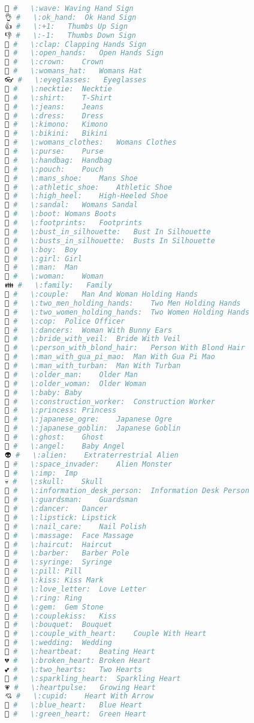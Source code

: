 \begin{lstlisting}[language=Julia, style=julia]
👋 #   \:wave: Waving Hand Sign
👌 #   \:ok_hand:  Ok Hand Sign
👍 #   \:+1:   Thumbs Up Sign
👎 #   \:-1:   Thumbs Down Sign
👏 #   \:clap: Clapping Hands Sign
👐 #   \:open_hands:   Open Hands Sign
👑 #   \:crown:    Crown
👒 #   \:womans_hat:   Womans Hat
👓 #   \:eyeglasses:   Eyeglasses
👔 #   \:necktie:  Necktie
👕 #   \:shirt:    T-Shirt
👖 #   \:jeans:    Jeans
👗 #   \:dress:    Dress
👘 #   \:kimono:   Kimono
👙 #   \:bikini:   Bikini
👚 #   \:womans_clothes:   Womans Clothes
👛 #   \:purse:    Purse
👜 #   \:handbag:  Handbag
👝 #   \:pouch:    Pouch
👞 #   \:mans_shoe:    Mans Shoe
👟 #   \:athletic_shoe:    Athletic Shoe
👠 #   \:high_heel:    High-Heeled Shoe
👡 #   \:sandal:   Womans Sandal
👢 #   \:boot: Womans Boots
👣 #   \:footprints:   Footprints
👤 #   \:bust_in_silhouette:   Bust In Silhouette
👥 #   \:busts_in_silhouette:  Busts In Silhouette
👦 #   \:boy:  Boy
👧 #   \:girl: Girl
👨 #   \:man:  Man
👩 #   \:woman:    Woman
👪 #   \:family:   Family
👫 #   \:couple:   Man And Woman Holding Hands
👬 #   \:two_men_holding_hands:    Two Men Holding Hands
👭 #   \:two_women_holding_hands:  Two Women Holding Hands
👮 #   \:cop:  Police Officer
👯 #   \:dancers:  Woman With Bunny Ears
👰 #   \:bride_with_veil:  Bride With Veil
👱 #   \:person_with_blond_hair:   Person With Blond Hair
👲 #   \:man_with_gua_pi_mao:  Man With Gua Pi Mao
👳 #   \:man_with_turban:  Man With Turban
👴 #   \:older_man:    Older Man
👵 #   \:older_woman:  Older Woman
👶 #   \:baby: Baby
👷 #   \:construction_worker:  Construction Worker
👸 #   \:princess: Princess
👹 #   \:japanese_ogre:    Japanese Ogre
👺 #   \:japanese_goblin:  Japanese Goblin
👻 #   \:ghost:    Ghost
👼 #   \:angel:    Baby Angel
👽 #   \:alien:    Extraterrestrial Alien
👾 #   \:space_invader:    Alien Monster
👿 #   \:imp:  Imp
💀 #   \:skull:    Skull
💁 #   \:information_desk_person:  Information Desk Person
💂 #   \:guardsman:    Guardsman
💃 #   \:dancer:   Dancer
💄 #   \:lipstick: Lipstick
💅 #   \:nail_care:    Nail Polish
💆 #   \:massage:  Face Massage
💇 #   \:haircut:  Haircut
💈 #   \:barber:   Barber Pole
💉 #   \:syringe:  Syringe
💊 #   \:pill: Pill
💋 #   \:kiss: Kiss Mark
💌 #   \:love_letter:  Love Letter
💍 #   \:ring: Ring
💎 #   \:gem:  Gem Stone
💏 #   \:couplekiss:   Kiss
💐 #   \:bouquet:  Bouquet
💑 #   \:couple_with_heart:    Couple With Heart
💒 #   \:wedding:  Wedding
💓 #   \:heartbeat:    Beating Heart
💔 #   \:broken_heart: Broken Heart
💕 #   \:two_hearts:   Two Hearts
💖 #   \:sparkling_heart:  Sparkling Heart
💗 #   \:heartpulse:   Growing Heart
💘 #   \:cupid:    Heart With Arrow
💙 #   \:blue_heart:   Blue Heart
💚 #   \:green_heart:  Green Heart

\end{lstlisting}
